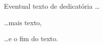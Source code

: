 



\begin{myDedication}

Eventual texto de dedicatória \ldots

\vskip0.4in
\ldots mais texto,

\vskip0.8in
\ldots e o fim do texto.
    
    
\end{myDedication}